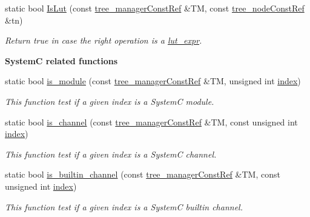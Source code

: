 \begin{DoxyCompactItemize}
static bool \hyperlink{classtree__helper_a3a01e21342fdb1f1c65b383e8bc12d4b}{Is\+Lut} (const \hyperlink{tree__manager_8hpp_a792e3f1f892d7d997a8d8a4a12e39346}{tree\+\_\+manager\+Const\+Ref} \&TM, const \hyperlink{tree__node_8hpp_a3cf5d02292c940f3892425a5b5fdec3c}{tree\+\_\+node\+Const\+Ref} \&tn)
\begin{DoxyCompactList}\small\item\em Return true in case the right operation is a \hyperlink{structlut__expr}{lut\+\_\+expr}. \end{DoxyCompactList}\end{DoxyCompactItemize}
\begin{Indent}\textbf{ SystemC related functions}\par
\begin{DoxyCompactItemize}
\item 
static bool \hyperlink{classtree__helper_a7ca2622f28872c5e2c61bde0bfe37610}{is\+\_\+module} (const \hyperlink{tree__manager_8hpp_a792e3f1f892d7d997a8d8a4a12e39346}{tree\+\_\+manager\+Const\+Ref} \&TM, unsigned int \hyperlink{tutorial__pact__2019_2Introduction_2third_2include_2Keccak_8h_a028c9bdc8344cca38ab522a337074797}{index})
\begin{DoxyCompactList}\small\item\em This function test if a given index is a SystemC module. \end{DoxyCompactList}\item 
static bool \hyperlink{classtree__helper_af7d6783fd734a05edd5728b2a8e98b77}{is\+\_\+channel} (const \hyperlink{tree__manager_8hpp_a792e3f1f892d7d997a8d8a4a12e39346}{tree\+\_\+manager\+Const\+Ref} \&TM, const unsigned int \hyperlink{tutorial__pact__2019_2Introduction_2third_2include_2Keccak_8h_a028c9bdc8344cca38ab522a337074797}{index})
\begin{DoxyCompactList}\small\item\em This function test if a given index is a SystemC channel. \end{DoxyCompactList}\item 
static bool \hyperlink{classtree__helper_af8cf910fccca7d978c710dc49c57ec1c}{is\+\_\+builtin\+\_\+channel} (const \hyperlink{tree__manager_8hpp_a792e3f1f892d7d997a8d8a4a12e39346}{tree\+\_\+manager\+Const\+Ref} \&TM, const unsigned int \hyperlink{tutorial__pact__2019_2Introduction_2third_2include_2Keccak_8h_a028c9bdc8344cca38ab522a337074797}{index})
\begin{DoxyCompactList}\small\item\em This function test if a given index is a SystemC builtin channel. \end{DoxyCompactList}\item 

\end{DoxyCompactItemize}
\end{Indent}
